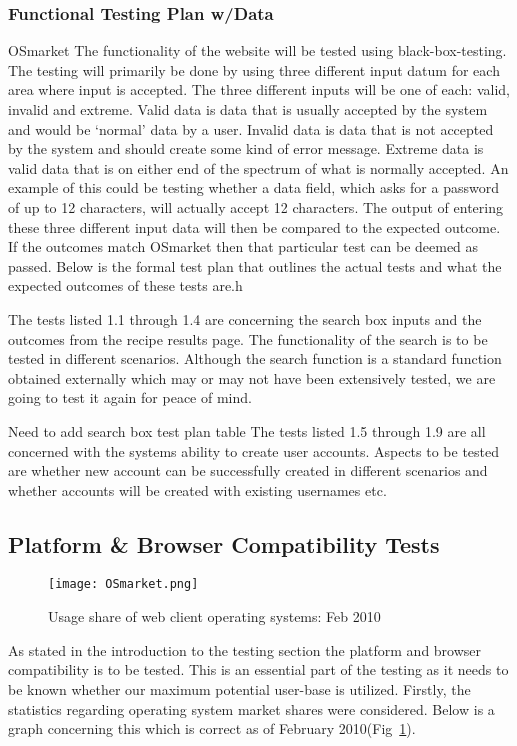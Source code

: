 \subsubsection{Functional Testing Plan w/Data}
OSmarket
The functionality of the website will be tested using black-box-testing. 
The testing will primarily be done by using three different input datum 
for each area where input is accepted. The three different inputs will 
be one of each: valid, invalid and extreme.
Valid data is data that is usually accepted by the system and would be 
‘normal’ data by a user. Invalid data is data that is not accepted by 
the system and should create some kind of error message. Extreme data 
is valid data that is on either end of the spectrum of what is normally 
accepted. An example of this could be testing whether a data field,
 which asks for a password of up to 12 characters, will actually accept 
12 characters. The output of entering these three different input data 
will then be compared to the expected outcome. If the outcomes match OSmarket
then that particular test can be deemed as passed. Below is the formal 
test plan that outlines the actual tests and what the expected outcomes 
of these tests are.h


The tests listed 1.1 through 1.4 are concerning the search box inputs 
and the outcomes from the recipe results page. The functionality of the 
search is to be tested in different scenarios. Although the search function 
is a standard function obtained externally which may or may not have been 
extensively tested, we are going to test it again for peace of mind.
\newline{}

Need to add search box test plan table
The tests listed 1.5 through 1.9 are all concerned with the systems ability 
to create user accounts. Aspects to be tested are whether new account can be 
successfully created in different scenarios and whether accounts will be created 
with existing usernames etc.

\subsection{Platform \& Browser Compatibility Tests}
\begin{figure}[h]
\texttt{[image: OSmarket.png]}
\caption{Usage share of web client operating systems: Feb 2010}
\label{fig:OSmarket}
\end{figure}


As stated in the introduction to the testing section the platform and browser 
compatibility is to be tested. This is an essential part of the testing as it needs 
to be known whether our maximum potential user-base is utilized. Firstly, 
the statistics regarding operating system market shares were considered. Below is
 a graph concerning this which is correct as of February 2010(Fig~\ref{fig:OSmarket}).
\newline{}


